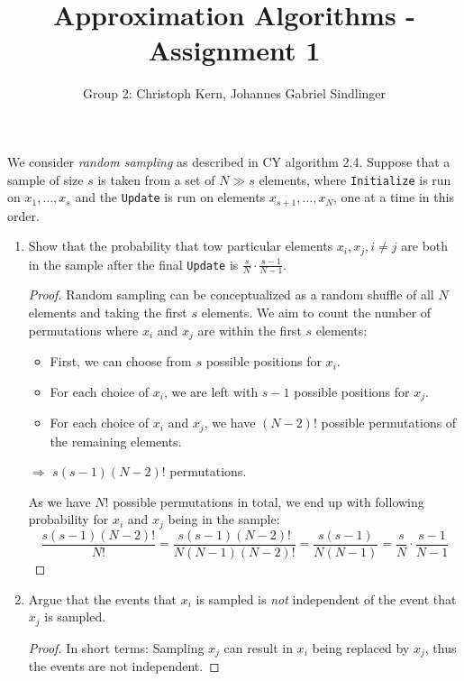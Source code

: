 \documentclass{article}
\title{Approximation Algorithms - Assignment 1}
\author{Group 2: Christoph Kern, Johannes Gabriel Sindlinger}
\begin{document}
\maketitle

We consider \emph{random sampling} as described in CY algorithm 2.4. Suppose that a sample of size $s$ is taken from a set of $N \gg s$ elements, where \texttt{Initialize} is run on $x_1,\dots,x_s$ and the \texttt{Update} is run on elements $x_{s+1},\dots,x_N$, one at a time in this order.

\begin{enumerate}
    \item Show that the probability that tow particular elements $x_i,x_j,i\not=j$ are both in the sample after the final \texttt{Update} is $\frac{s}{N} \cdot \frac{s-1}{N-1}$.

    \begin{proof}
        Random sampling can be conceptualized as a random shuffle of all $N$ elements and taking the first $s$ elements. We aim to count the number of permutations where $x_i$ and $x_j$ are within the first $s$ elements:
        \begin{itemize}
            \item First, we can choose from $s$ possible positions for $x_i$.
            \item For each choice of $x_i$, we are left with $s-1$ possible positions for $x_j$.
            \item For each choice of $x_i$ and $x_j$, we have $(N-2)!$ possible permutations of the remaining elements.
        \end{itemize}
        $\Rightarrow$ $s (s-1) (N-2)!$ permutations. 

        As we have $N!$ possible permutations in total, we end up with following probability for $x_i$ and $x_j$ being in the sample:
        \[
            \frac{s (s-1) (N-2)!}{N!} = \frac{s (s-1) (N-2)!}{N(N-1)(N-2)!} = \frac{s (s-1)}{N(N-1)} = \frac{s}{N} \cdot \frac{s-1}{N-1}
        \]
    \end{proof}

    
    \item Argue that the events that $x_i$ is sampled is \emph{not} independent of the event that $x_j$ is sampled.

    \begin{proof}
        In short terms: Sampling $x_j$ can result in $x_i$ being replaced by $x_j$, thus the events are not independent.


\end{proof}
\end{enumerate}
\end{document}
